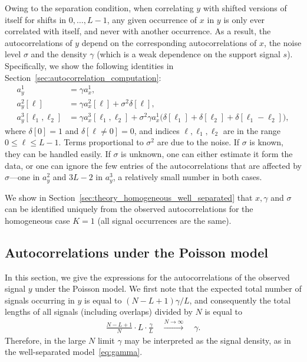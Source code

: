 \documentclass[12pt]{article}
\newcommand{\1}{\mathbf{1}}
\newcommand{\Poisson}{\text{Poisson}}
\theoremstyle{plain}
\theoremstyle{definition}
\theoremstyle{remark}
\theoremstyle{plain}
\theoremstyle{remark}
\theoremstyle{plain}
\theoremstyle{plain}
\theoremstyle{plain}
\numberwithin{equation}{section}
\begin{document}
Owing to the separation condition, when correlating $y$ with shifted versions of itself for shifts in $0, \ldots, L-1$, any given occurrence of $x$ in $y$ is only ever correlated with itself, and never with another occurrence. As a result, the autocorrelations of $y$ depend on the corresponding autocorrelations of $x$, the noise level $\sigma$ and the density $\gamma$ (which is a weak dependence on the support signal $s$). Specifically, we show the following identities in Section~\ref{sec:autocorrelation_computation}:
\begin{align} 
	a_y^1 & = \gamma a_{x}^1, \label{eq:mean_micrograph} \\
	a_y^2[\ell] & = \gamma a_{x}^2[\ell] + \sigma^2\delta[\ell], \label{eq:ac2_micrograph}\\
	a_y^3[\ell_1,\ell_2] & = \gamma a_{x}^3[\ell_1,\ell_2]  + \sigma^2\gamma a_{x}^1  \big(\delta[\ell_1]+\delta[\ell_2]
	+\delta[\ell_1-\ell_2]\big), \label{eq:ac3_micrograph}
\end{align}
where $\delta[0] = 1$ and $\delta[\ell \neq 0] = 0$, and indices $\ell, \ell_1, \ell_2$ are in the range $0 \leq \ell \leq L-1$. Terms proportional to $\sigma^2$ are due to the noise. If $\sigma$ is known, they can be handled easily. If $\sigma$ is unknown, one can either estimate it form the data, or one can ignore the few entries of the autocorrelations that are affected by $\sigma$---one in $a_y^2$ and $3L-2$ in $a_y^3$, a relatively small number in both cases.


We show in Section~\ref{sec:theory_homogeneous_well_separated} 
that $x,\gamma$ and $\sigma$ can be identified uniquely from the observed autocorrelations for the homogeneous case $K = 1$ (all signal occurrences are the same).

\subsection{Autocorrelations under the Poisson model}

In this section, we give the expressions for the autocorrelations of the observed signal $y$ under the Poisson model. %
 We first note that the expected total number of signals occurring in $y$ is equal to $(N - L + 1)\gamma / L$, and consequently the total lengths of all signals (including overlaps) divided by $N$ is equal to
%
\begin{align}
\frac{N - L + 1}{N} \cdot L \cdot \frac{\gamma  }{L} 
\quad \overset{N\to\infty}{\longrightarrow} \quad \gamma.
\end{align}
%
Therefore, in the large $N$ limit $\gamma$ may be interpreted as the signal density, as in the well-separated model~\eqref{eq:gamma}.
\end{document}
